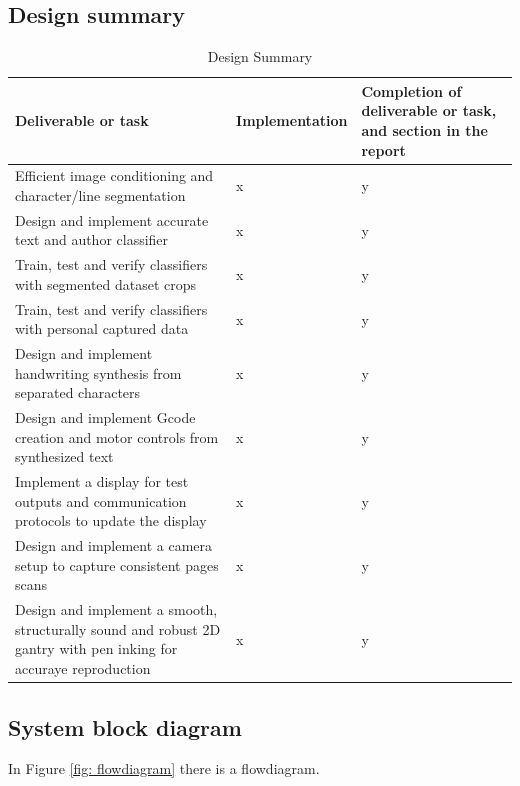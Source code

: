
\subsection{Design summary} %



    \begin{table}[h]
    \centering
    \fontsize{10}{12}\selectfont
    \begin{tabularx}{\linewidth}{|X|X|X|}
        \hline 
        \textbf{Deliverable or task} & \textbf{Implementation} & \textbf{Completion of deliverable or task, and section in the report} \\
        \hline 
        Efficient image conditioning and character/line segmentation & x & y \\
        \hline 
        Design and implement accurate text and author classifier & x & y \\
        \hline 
        Train, test and verify classifiers with segmented dataset crops & x & y \\
        \hline 
        Train, test and verify classifiers with personal captured data & x & y \\
        \hline 
        Design and implement handwriting synthesis from separated characters & x & y \\
        \hline 
        Design and implement Gcode creation and motor controls from synthesized text& x & y \\
        \hline 
        Implement a display for test outputs and communication protocols to update the display & x & y \\
        \hline 
        Design and implement a camera setup to capture consistent pages scans & x & y \\
        \hline 
        Design and implement a smooth, structurally sound and robust 2D gantry with pen inking for accuraye reproduction & x & y \\
        \hline 
    \end{tabularx}
    \caption{Design Summary}
    \label{tab: DesignSummary}
    \end{table} 
    
    
\subsection{System block diagram} %

     In Figure \ref{fig: flowdiagram} there is a flowdiagram. \\

